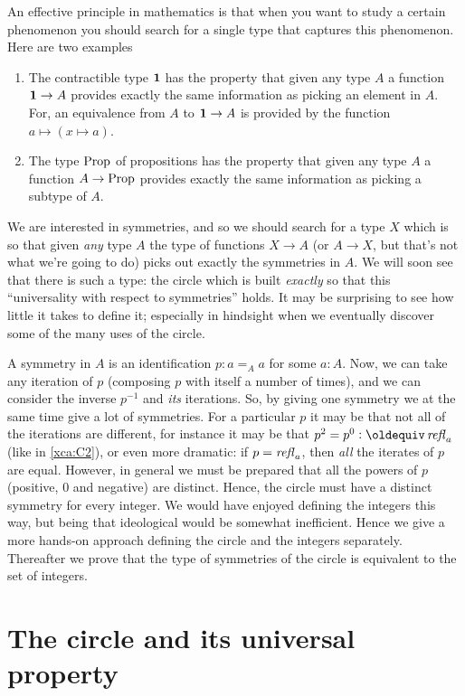 
\label{cha:circle}

An effective principle in mathematics is that when you want to study a certain 
phenomenon you should search for a single type that captures this phenomenon.  
Here are two examples
\begin{enumerate}
\item The contractible type $\mathbf{1}$ has the property that given 
any type $A$ a function $\mathbf{1}\to A$ provides exactly the 
same information as picking an element in $A$.
For, an equivalence from $A$ to $\mathbf{1}\to A$ is provided by
the function $a \mapsto (x \mapsto a)$.
\item The type $\mathord{\mathrm{Prop}}$ of propositions has the property that 
given any type $A$ a function $A\to\mathord{\mathrm{Prop}}$ provides exactly 
the same information as picking a subtype of $A$.
\end{enumerate}
We are interested in symmetries, and so we should search for a type $X$ 
which is so that given \emph{any} type $A$ the type of functions 
$X\to A$ (or $A\to X$, but that's not what we're going to do) 
picks out exactly the symmetries in $A$.  
We will soon see that there is such a type: 
the circle which is built \emph{exactly} so that this 
``universality with respect to symmetries'' holds.  
It may be surprising to see how little it takes to define it; 
especially in hindsight when we eventually discover some of the many uses of the circle.

A symmetry in $A$ is an identification $p:a=_Aa$ for some $a:A$.  
Now, we can take any iteration of $p$ (composing $p$ with itself a number of times), 
and we can consider the inverse $p^{-1}$ and \emph{its} iterations.  
So, by giving one symmetry we at the same time give a lot of symmetries.  
For a particular $p$ it may be that not all of the iterations are different, 
for instance it may be that $p^2=p^0\defequi\refl a$ (like in \cref{xca:C2}), 
or even more dramatic: if  $p=\mathop{{\it refl}_{a}}$, then \emph{all} the iterates of $p$ are equal. 
However, in general we must be prepared that all the powers of $p$ 
(positive, $0$ and negative) are distinct. 
Hence, the circle must have a distinct symmetry for every integer. 
We would have enjoyed defining the integers this way, 
but being that ideological would be somewhat inefficient. 
Hence we give a more hands-on approach defining the circle 
and the integers separately. Thereafter we prove that the type of 
symmetries of the circle is equivalent to the set of integers. 

\section{The circle and its universal property}
\label{sec:S1}

